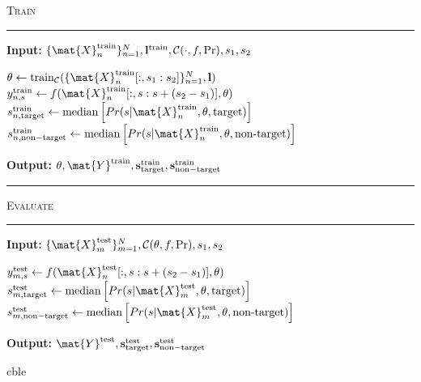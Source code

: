 \begin{algorithm}[H]
	\textsc{Train}
	\smallskip \hrule \smallskip
	\textbf{Input:} $\{\mat{X}_n^\mathrm{train}\}_{n=1}^N,
  \mathbf{l}^\mathrm{train}, \mathcal{C}(\cdot,f, \Pr), s_1, s_2$
  \begin{algorithmic}[1]
		\State $\theta \gets
			\mathrm{train}_\mathcal{C}(\{\mat{X}_n^\mathrm{train}[:,s_1:s_2]\}_{n=1}^N,\mathbf{l})$
      \State $y_{n,s}^\mathrm{train} \gets f(\mat{X}_n^\mathrm{train}[:,s:s+(s_2-s_1)],\theta)$
        \EndFor
        \State $s_{n,\mathrm{target}}^\mathrm{train} \gets
			    \mathrm{median}\left[Pr(s|\mat{X}_n^\mathrm{train},\theta,\mathrm{target})\right]$
		    \State $s_{n,\mathrm{non-target}}^\mathrm{train}\gets
			    \mathrm{median}\left[Pr(s|\mat{X}_n^\mathrm{train},\theta,\textrm{non-target})\right]$
    \EndFor
	\end{algorithmic}
  \textbf{Output:} $\theta,
  \mat{Y}^\mathrm{train},
  \mathbf{s}_\mathrm{target}^\mathrm{train},
  \mathbf{s}_\mathrm{non-target}^\mathrm{train}$
	\smallskip \hrule \smallskip
	\textsc{Evaluate}
	\smallskip \hrule \smallskip
	\textbf{Input:} $\{\mat{X}_m^\mathrm{test}\}_{m=1}^N, \mathcal{C}(\theta,f, \Pr), s_1, s_2$
  \begin{algorithmic}[1]
      \State $y_{m,s}^\mathrm{test} \gets f(\mat{X}_n^\mathrm{test}[:,s:s+(s_2-s_1)],\theta)$
        \EndFor
        \State $s_{m,\mathrm{target}}^\mathrm{test} \gets
			    \mathrm{median}\left[Pr(s|\mat{X}_m^\mathrm{test},\theta,\mathrm{target})\right]$
		    \State $s_{m,\mathrm{non-target}}^\mathrm{test}\gets
			    \mathrm{median}\left[Pr(s|\mat{X}_m^\mathrm{test},\theta,\textrm{non-target})\right]$
    \EndFor
	\end{algorithmic}
  \textbf{Output:} $\mat{Y}^\mathrm{test},
  \mathbf{s}_\mathrm{target}^\mathrm{test},
  \mathbf{s}_\mathrm{non-target}^\mathrm{test}$

  \caption{\Ac{cble}}
	\label{alg:cble}
\end{algorithm}

